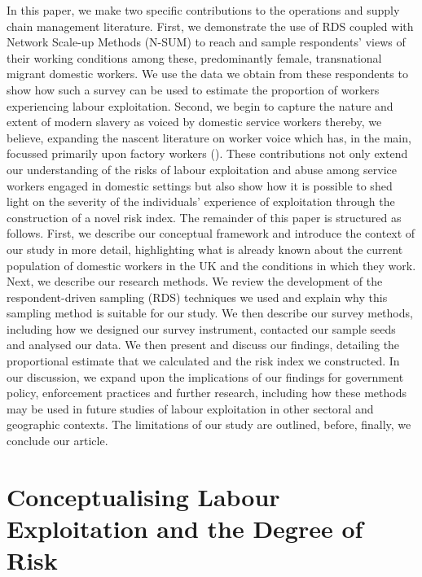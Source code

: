 \documentclass[
  12pt,
]{article}
\theoremstyle{plain}
\theoremstyle{definition}
\begin{document}
In this paper, we make two specific contributions to the operations and
supply chain management literature. First, we demonstrate the use of RDS
coupled with Network Scale-up Methods (N-SUM) to reach and sample
respondents' views of their working conditions among these,
predominantly female, transnational migrant domestic workers. We use the
data we obtain from these respondents to show how such a survey can be
used to estimate the proportion of workers experiencing labour
exploitation. Second, we begin to capture the nature and extent of
modern slavery as voiced by domestic service workers thereby, we
believe, expanding the nascent literature on worker voice which has, in
the main, focussed primarily upon factory workers
(\textcite{stephens_theorising_2024}). These contributions not only
extend our understanding of the risks of labour exploitation and abuse
among service workers engaged in domestic settings but also show how it
is possible to shed light on the severity of the individuals' experience
of exploitation through the construction of a novel risk index. The
remainder of this paper is structured as follows. First, we describe our
conceptual framework and introduce the context of our study in more
detail, highlighting what is already known about the current population
of domestic workers in the UK and the conditions in which they work.
Next, we describe our research methods. We review the development of the
respondent-driven sampling (RDS) techniques we used and explain why this
sampling method is suitable for our study. We then describe our survey
methods, including how we designed our survey instrument, contacted our
sample seeds and analysed our data. We then present and discuss our
findings, detailing the proportional estimate that we calculated and the
risk index we constructed. In our discussion, we expand upon the
implications of our findings for government policy, enforcement
practices and further research, including how these methods may be used
in future studies of labour exploitation in other sectoral and
geographic contexts. The limitations of our study are outlined, before,
finally, we conclude our article.

\section{Conceptualising Labour Exploitation and the Degree of
Risk}\label{conceptualising-labour-exploitation-and-the-degree-of-risk}
\end{document}
